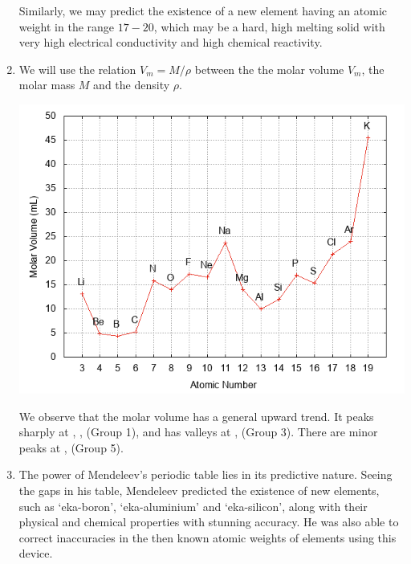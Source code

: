 \documentclass[10pt]{article}
\begin{document}
\begin{enumerate}
                        Similarly, we may predict the existence of a new element  having an atomic weight in the range $17-20$,
                        which may be a hard, high melting solid with very high electrical conductivity and high chemical reactivity.
                \item We will use the relation $V_m = M / \rho$ between the the molar volume $V_m$, the molar mass $M$ and the density $\rho$.
                \begin{center}
                        \includegraphics[scale=0.7]{volumeplot.png}
                \end{center}
                We observe that the molar volume has a general upward trend. It peaks sharply at , ,  (Group 1),
                and has valleys at ,  (Group 3). There are minor peaks at ,  (Group 5).
                \item
                The power of Mendeleev's periodic table lies in its predictive nature. Seeing the gaps in his table, Mendeleev predicted the
                existence of new elements, such as `eka-boron', `eka-aluminium' and `eka-silicon', along with their physical and chemical properties
                with stunning accuracy. He was also able to correct inaccuracies in the then known atomic weights of elements using this device.


\end{enumerate}
\end{document}
